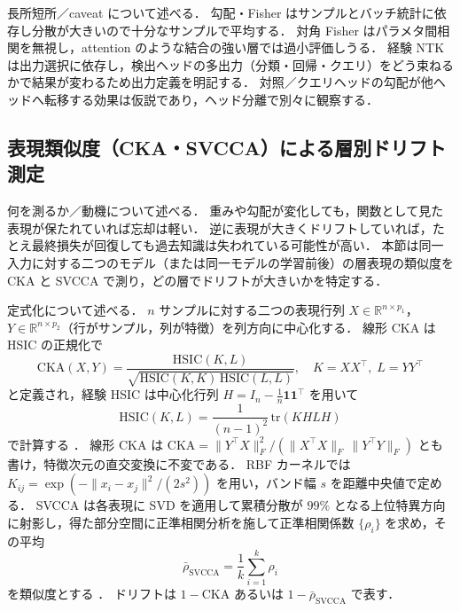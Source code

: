 長所短所／caveat について述べる．
勾配・Fisher はサンプルとバッチ統計に依存し分散が大きいので十分なサンプルで平均する．
対角 Fisher はパラメタ間相関を無視し，attention のような結合の強い層では過小評価しうる．
経験 NTK は出力選択に依存し，検出ヘッドの多出力（分類・回帰・クエリ）をどう束ねるかで結果が変わるため出力定義を明記する．
対照／クエリヘッドの勾配が他ヘッドへ転移する効果は仮説であり，ヘッド分離で別々に観察する．


\subsection{表現類似度（CKA・SVCCA）による層別ドリフト測定}
\label{subsec:representation-similarity}

何を測るか／動機について述べる．
重みや勾配が変化しても，関数として見た表現が保たれていれば忘却は軽い．
逆に表現が大きくドリフトしていれば，たとえ最終損失が回復しても過去知識は失われている可能性が高い．
本節は同一入力に対する二つのモデル（または同一モデルの学習前後）の層表現の類似度を CKA \cite{cka_kornblith2019} と SVCCA \cite{svcca_raghu2017} で測り，どの層でドリフトが大きいかを特定する．

定式化について述べる．
$n$ サンプルに対する二つの表現行列 $X \in \mathbb{R}^{n \times p_1}$，$Y \in \mathbb{R}^{n \times p_2}$（行がサンプル，列が特徴）を列方向に中心化する．
線形 CKA は HSIC の正規化で
\begin{equation}
\mathrm{CKA}(X, Y) = \frac{\mathrm{HSIC}(K, L)}{\sqrt{\mathrm{HSIC}(K, K)\,\mathrm{HSIC}(L, L)}}, \quad K = X X^{\top}, \; L = Y Y^{\top}
\end{equation}
と定義され，経験 HSIC は中心化行列 $H = I_n - \tfrac{1}{n}\mathbf{1}\mathbf{1}^{\top}$ を用いて
\begin{equation}
\mathrm{HSIC}(K, L) = \frac{1}{(n-1)^2}\,\mathrm{tr}(K H L H)
\end{equation}
で計算する \cite{cka_kornblith2019}．
線形 CKA は $\mathrm{CKA} = \| Y^{\top} X \|_F^2 / (\| X^{\top} X \|_F \, \| Y^{\top} Y \|_F)$ とも書け，特徴次元の直交変換に不変である．
RBF カーネルでは $K_{ij} = \exp(-\| x_i - x_j \|^2 / (2 s^2))$ を用い，バンド幅 $s$ を距離中央値で定める．
SVCCA は各表現に SVD を適用して累積分散が $99\%$ となる上位特異方向に射影し，得た部分空間に正準相関分析を施して正準相関係数 $\{\rho_i\}$ を求め，その平均
\begin{equation}
\bar{\rho}_{\mathrm{SVCCA}} = \frac{1}{k}\sum_{i=1}^{k} \rho_i
\end{equation}
を類似度とする \cite{svcca_raghu2017}．
ドリフトは $1 - \mathrm{CKA}$ あるいは $1 - \bar{\rho}_{\mathrm{SVCCA}}$ で表す．

